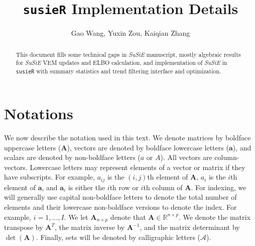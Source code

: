 \documentclass[11pt,authoryear]{article}
\numberwithin{equation}{section}
\theoremstyle{plain}
\newcommand{\susie}{\textsl{SuSiE}\xspace}
\begin{document}
\singlespacing
\title{\texttt{susieR} Implementation Details}
\author{Gao Wang, Yuxin Zou, Kaiqian Zhang}
\maketitle

\begin{abstract}
This document fills some technical gaps in \susie manuscript, mostly algebraic results for \susie VEM updates and ELBO calculation, and implementation of \susie in \texttt{susieR} with summary statistics and trend filtering interface and optimization.
\end{abstract}

\section{Notations}

We now describe the notation used in this text. We denote matrices by
boldface uppercase letters ($\mathbf{A}$), vectors are denoted by boldface
lowercase letters ($\mathbf{a}$), and scalars are denoted by non-boldface
letters ($a$ or $A$). All vectors are column-vectors. Lowercase
letters may represent elements of a vector or matrix if they have
subscripts. For example, $a_{ij}$ is the $(i,j)$th element of
$\mathbf{A}$, $a_i$ is the $i$th element of $\mathbf{a}$, and $\mathbf{a}_{i}$ is
either the $i$th row or $i$th column of $\mathbf{A}$. For indexing, we
will generally use capital non-boldface letters to denote the total
number of elements and their lowercase non-boldface versions to denote
the index. For example, $i = 1,\ldots,I$. We let $\mathbf{A}_{n \times p}$
denote that $\mathbf{A} \in \mathbb{R}^{n \times p}$. We denote the matrix
transpose by $\mathbf{A}^T$, the matrix inverse by $\mathbf{A}^{-1}$,
and the matrix determinant by $\det(\mathbf{A})$. Finally, sets will be
denoted by calligraphic letters ($\mathcal{A}$).





\end{document}
